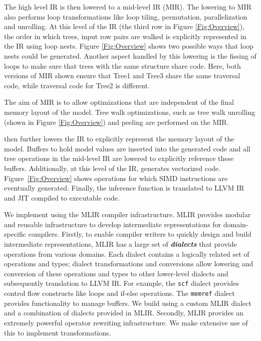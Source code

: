 The high level IR is then lowered to a mid-level IR (MIR).
The lowering to MIR also performs loop transformations like loop tiling, permutation, parallelization and unrolling.
At this level of the IR (the third row in Figure \ref{Fig:Overview}),
the order in which trees, input row pairs are walked is explicitly represented in the IR using loop nests.
Figure \ref{Fig:Overview} shows two possible ways that loop nests could be generated.
 Another aspect handled by this lowering is the fissing of 
loops to make sure that trees with the same structure share code. Here, both versions of MIR shown 
ensure that Tree1 and Tree3 share the same traversal code, while traversal code for Tree2 is different.

 The aim of MIR is 
to allow optimizations that are independent of the final memory layout of the model. 
Tree walk optimizations, such as tree walk unrolling (shown in Figure \ref{Fig:Overview}) and 
peeling are performed on the MIR.

\Treebeard{} then further lowers the IR to explicitly represent the memory layout of the model. Buffers to hold model 
values are inserted into the generated code and all tree operations in the mid-level IR are lowered to explicitly 
reference these buffers. Additionally, at this level of the IR, \Treebeard{} generates vectorized code. 
Figure~\ref{Fig:Overview} shows operations for which SIMD instructions are eventually generated. 
Finally, the inference function is translated to LLVM IR and 
JIT compiled to executable code. 

We implement \Treebeard{} using the MLIR compiler infrastructure\cite{MLIR}. MLIR provides modular and reusable infrastructure
to develop intermediate representations for domain-specific compilers. Firstly, to enable compiler writers to 
quickly design and build intermediate representations, MLIR has a large set of 
\textbf{\emph{dialects}} that provide operations from various domains. Each dialect 
contains a logically related set of operations and types; dialect transformations and conversions allow lowering and conversion of these operations and types to other lower-level dialects and subsequently translation to LLVM IR. 
For example, the \texttt{scf} dialect provides control flow constructs like loops and if-else operations. 
The \texttt{memref} dialect provides functionality to manage buffers. We build \Treebeard{} using a custom
MLIR dialect and a combination of dialects provided in MLIR. Secondly, MLIR provides an extremely powerful 
operator rewriting infrastructure. We make extensive use of this to implement transformations.

